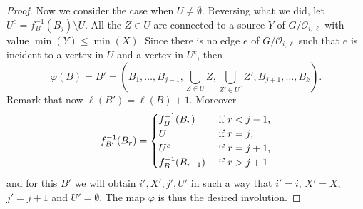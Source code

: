 \documentclass[ALCO,ThmDefs,Unicode,epreuves]{cedram}
\begin{document}
\begin{proof}
Now we consider the case when $U\ne\emptyset$. 
Reversing what we did, let $U^c=f^{-1}_{B}(B_j)\setminus U$. 
All the $Z\in U$ are connected to a source $Y$ of $G/\mathcal{O}_{i,\ell}$ with value $\min(Y)\le \min(X)$.
Since there is no edge $e$ of $G/\mathcal{O}_{i,\ell}$ such that $e$ is incident to a vertex in $U$ and a vertex in $U^c$, then
\begin{equation}\label{a_split}
 \varphi({B})={B}'= (B_1,\ldots,B_{j-1},\bigcup_{Z\in U} Z,\bigcup_{Z'\in U^c} Z',B_{j+1},\ldots,B_k).
\end{equation}
 Remark that now $\ell({B'})=\ell({B})+1$.
 Moreover
 $$f^{-1}_{B'}(B_r)= \begin{cases}
 f^{-1}_{B}(B_r) &\text{ if $r<j-1$,}\cr 
 U&\text{ if $r=j$,}\cr 
 U^c&\text{ if $r=j+1$,}\cr 
 f^{-1}_{B}(B_{r-1})&\text{ if $r>j+1$}\cr
 \end{cases}$$
and for this ${B}'$ we will obtain $i',X',j',U'$ in such a way that $i'=i$, $X'=X$, $j'=j+1$ and $U'=\emptyset$. The map $ \varphi$ is thus the desired involution.
\end{proof}
\end{document}
